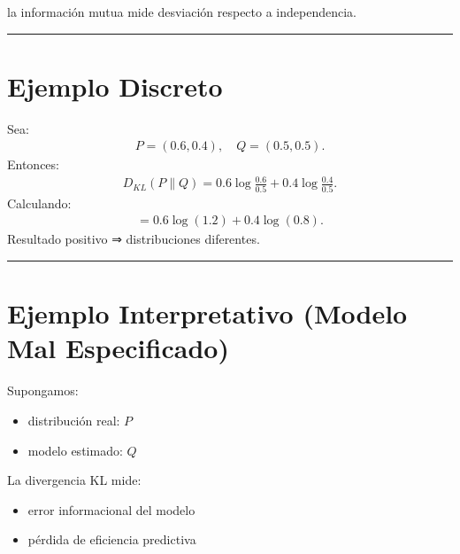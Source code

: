 \documentclass[letterpaper,10pt,english]{jupyterBook}
\begin{document}
\sphinxAtStartPar
la información mutua mide desviación respecto a independencia.


\bigskip\hrule\bigskip



\section{Ejemplo Discreto}
\label{\detokenize{02_mathematical_foundations/kl_divergence:ejemplo-discreto}}
\sphinxAtStartPar
Sea:
\begin{equation*}
\begin{split}
P=(0.6,0.4),
\quad
Q=(0.5,0.5).
\end{split}
\end{equation*}
\sphinxAtStartPar
Entonces:
\begin{equation*}
\begin{split}
D_{KL}(P\|Q)
=
0.6\log\frac{0.6}{0.5}
+
0.4\log\frac{0.4}{0.5}.
\end{split}
\end{equation*}
\sphinxAtStartPar
Calculando:
\begin{equation*}
\begin{split}
=0.6\log(1.2)+0.4\log(0.8).
\end{split}
\end{equation*}
\sphinxAtStartPar
Resultado positivo ⇒ distribuciones diferentes.


\bigskip\hrule\bigskip



\section{Ejemplo Interpretativo (Modelo Mal Especificado)}
\label{\detokenize{02_mathematical_foundations/kl_divergence:ejemplo-interpretativo-modelo-mal-especificado}}
\sphinxAtStartPar
Supongamos:
\begin{itemize}
\item {} 
\sphinxAtStartPar
distribución real: \(P\)

\item {} 
\sphinxAtStartPar
modelo estimado: \(Q\)

\end{itemize}

\sphinxAtStartPar
La divergencia KL mide:
\begin{itemize}
\item {} 
\sphinxAtStartPar
error informacional del modelo

\item {} 
\sphinxAtStartPar
pérdida de eficiencia predictiva

\end{itemize}
\end{document}
